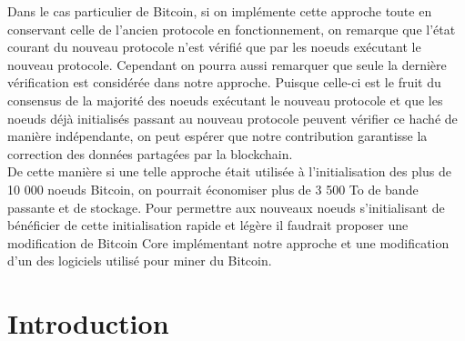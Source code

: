 \documentclass[12pt,a4paper]{article}
\begin{document}
	Dans le cas particulier de Bitcoin, si on implémente cette approche toute en conservant celle de l'ancien protocole en fonctionnement, on remarque que l'état courant du nouveau protocole n'est vérifié que par les noeuds exécutant le nouveau protocole. Cependant on pourra aussi remarquer que seule la dernière vérification est considérée dans notre approche. Puisque celle-ci est le fruit du consensus de la majorité des noeuds exécutant le nouveau protocole et que les noeuds déjà initialisés passant au nouveau protocole peuvent vérifier ce haché de manière indépendante, on peut espérer que notre contribution garantisse la correction des données partagées par la blockchain.\\ %
	De cette manière si une telle approche était utilisée à l'initialisation des plus de 10 000 noeuds Bitcoin, on pourrait économiser plus de 3 500 To de bande passante et de stockage. Pour permettre aux nouveaux noeuds s'initialisant de bénéficier de cette initialisation rapide et légère il faudrait proposer une modification de Bitcoin Core implémentant notre approche et une modification d'un des logiciels utilisé pour miner du Bitcoin.
	
	\tableofcontents
	
	\newpage
	
	\section{Introduction} %
	
\end{document}
